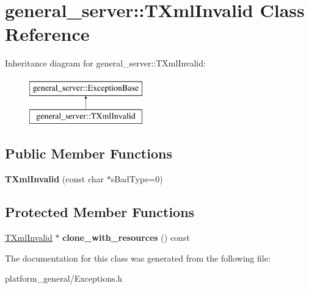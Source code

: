 \hypertarget{classgeneral__server_1_1TXmlInvalid}{\section{general\-\_\-server\-:\-:\-T\-Xml\-Invalid \-Class \-Reference}
\label{classgeneral__server_1_1TXmlInvalid}
}
\-Inheritance diagram for general\-\_\-server\-:\-:\-T\-Xml\-Invalid\-:\begin{figure}[H]
\begin{center}
\leavevmode
\includegraphics[height=2.000000cm]{classgeneral__server_1_1TXmlInvalid}
\end{center}
\end{figure}
\subsection*{\-Public \-Member \-Functions}
\begin{DoxyCompactItemize}
\item 
\hypertarget{classgeneral__server_1_1TXmlInvalid_a6a95d42d1a14aa2423efcf193cb35228}{{\bfseries \-T\-Xml\-Invalid} (const char $\ast$s\-Bad\-Type=0)}\label{classgeneral__server_1_1TXmlInvalid_a6a95d42d1a14aa2423efcf193cb35228}

\end{DoxyCompactItemize}
\subsection*{\-Protected \-Member \-Functions}
\begin{DoxyCompactItemize}
\item 
\hypertarget{classgeneral__server_1_1TXmlInvalid_a40f4954305e9068b7dbe87a5f27c3845}{\hyperlink{classgeneral__server_1_1TXmlInvalid}{\-T\-Xml\-Invalid} $\ast$ {\bfseries clone\-\_\-with\-\_\-resources} () const }\label{classgeneral__server_1_1TXmlInvalid_a40f4954305e9068b7dbe87a5f27c3845}

\end{DoxyCompactItemize}


\-The documentation for this class was generated from the following file\-:\begin{DoxyCompactItemize}
\item 
platform\-\_\-general/\-Exceptions.\-h\end{DoxyCompactItemize}
